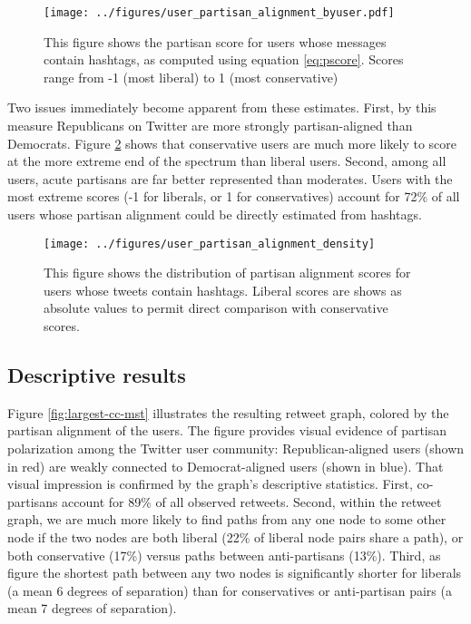 \documentclass[11pt]{article}
\begin{document}
\begin{figure}[ht]
  \centering
  \texttt{[image: ../figures/user\_partisan\_alignment\_byuser.pdf]}
  \caption{This figure shows the partisan score for users whose
    messages contain hashtags, as computed using equation
    \ref{eq:pscore}. Scores range from -1 (most liberal) to 1 (most conservative)}
  \label{fig:user-pscore}
\end{figure}

Two issues immediately become apparent from these estimates. First, by
this measure Republicans on Twitter are more strongly partisan-aligned
than Democrats. Figure \ref{fig:user-pscore-distribution} shows that
conservative users are much more likely to score at the more extreme
end of the spectrum than liberal users. Second, among all users, acute
partisans are far better represented than moderates. Users with the
most extreme scores (-1 for liberals, or 1 for conservatives) account
for 72\% of all users whose partisan alignment could be directly
estimated from hashtags. 

\begin{figure}[ht]
  \centering
  \texttt{[image: ../figures/user\_partisan\_alignment\_density]}
  \caption{This figure shows the distribution of partisan alignment
    scores for users whose tweets contain hashtags. Liberal scores are shows as absolute values to permit direct comparison with conservative scores. }
  \label{fig:user-pscore-distribution}
\end{figure}

\subsection{Descriptive results}
\label{sec:descriptive-results}

Figure \ref{fig:largest-cc-mst} illustrates the resulting retweet
graph, colored by the partisan alignment of the users. The figure
provides visual evidence of partisan polarization among the Twitter
user community: Republican-aligned users (shown in red) are weakly
connected to Democrat-aligned users (shown in blue). That visual
impression is confirmed by the graph's descriptive statistics. First,
co-partisans account for 89\% of all observed retweets. Second, within
the retweet graph, we are much more likely to find paths from any one
node to some other node if the two nodes are both liberal (22\% of
liberal node pairs share a path), or both conservative (17\%) versus
paths between anti-partisans (13\%). Third, as figure the shortest path between
any two nodes is significantly shorter for liberals (a mean 6 degrees
of separation) than for conservatives or anti-partisan pairs (a mean 7
degrees of separation). 
\end{document}
